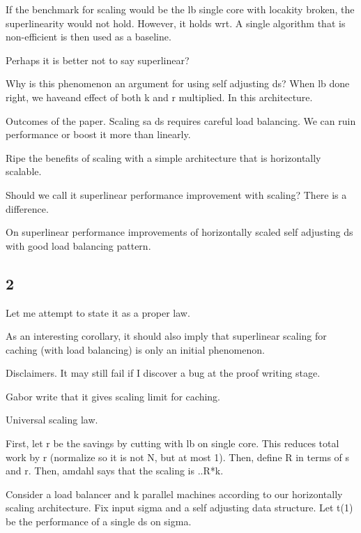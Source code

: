 If the benchmark for scaling would be the lb single core with locakity broken, the superlinearity would not hold. However, it holds wrt. A single algorithm that is non-efficient is then used as a baseline.

Perhaps it is better not to say superlinear?



Why is this phenomenon an argument for using self adjusting ds? When lb done right, we haveand effect of both k and r multiplied. In this architecture.

Outcomes of the paper. Scaling sa ds requires careful load balancing. We can ruin performance or boost it more than linearly.

Ripe the benefits of scaling with a simple architecture that is horizontally scalable.


Should we call it superlinear performance improvement with scaling? There is a difference.

On superlinear performance improvements of horizontally scaled self adjusting ds with good load balancing pattern.


\subsection{2}




Let me attempt to state it as a proper law.

As an interesting corollary, it should also imply that superlinear scaling for caching (with load balancing) is only an initial phenomenon.


Disclaimers. It may still fail if I discover a bug at the proof writing stage.






Gabor write that it gives scaling limit for caching.



Universal scaling law.

First, let r be the savings by cutting with lb on single core. This reduces total work by r (normalize so it is not N, but at most 1). Then, define R in terms of s and r. Then, amdahl says that the scaling is ..R*k.


Consider a load balancer and k parallel machines according to our horizontally scaling architecture. Fix input sigma and a self adjusting data structure. Let t(1) be the performance of a single ds on sigma.




